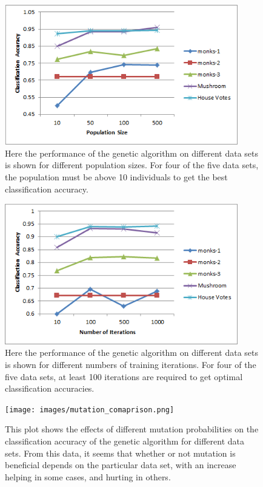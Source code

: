 \documentclass[12pt, letterpaper]{article}
\begin{document}
\begin{figure}[!htb]
\begin{center}
\includegraphics[width=4in]{images/population_comparison.png}
\end{center}
\caption{Here the performance of the genetic algorithm on different data sets
is shown for different population sizes.  For four of the five data sets, the
population must be above 10 individuals to get the best classification accuracy.
}
\label{Testing Times of Multiple Decision Trees}
\end{figure}



\begin{figure}[!htb]
\begin{center}
\includegraphics[width=4in]{images/iteration_comparison.png}
\end{center}
\caption{Here the performance of the genetic algorithm on different data sets
is shown for different numbers of training iterations.  For four of the five 
data sets, at least 100 iterations are required to get optimal classification 
accuracies.  
}
\label{Testing Times of Multiple Decision Trees}
\end{figure}

\begin{figure}[!htb]
\begin{center}
\texttt{[image: images/mutation\_comaprison.png]}
\end{center}
\caption{This plot shows the effects of different mutation probabilities on
the classification accuracy of the genetic algorithm for different data sets.  
From this data, it seems that whether or not mutation is beneficial depends on
the particular data set, with an increase helping in some cases, and hurting
in others.
}
\label{Testing Times of Multiple Decision Trees}
\end{figure}
\end{document}
